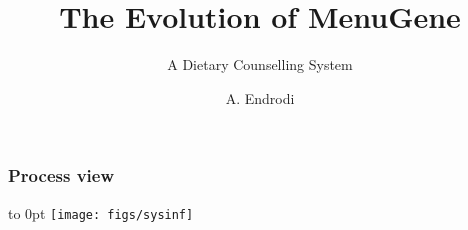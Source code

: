 \documentclass[12pt]{beamer}
\begin{document}
\title{The Evolution of MenuGene}
\subtitle{A Dietary Counselling System}
\author{A. Endrodi}
\maketitle

\bfseries

\begin{frame}
\frametitle{Process view}
\hspace*{-1cm}%
\hbox to 0pt{%
	\texttt{[image: figs/sysinf]}\hss}
\end{frame}

\end{document}

